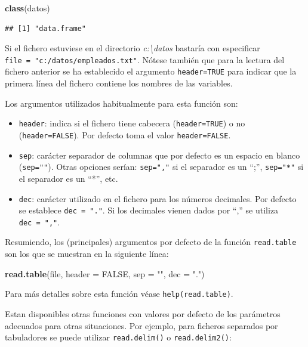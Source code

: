 \documentclass[
]{book}
\newenvironment{Shaded}{\begin{snugshade}}{\end{snugshade}}
\newcommand{\AttributeTok}[1]{\textcolor[rgb]{0.13,0.29,0.53}{#1}}
\newcommand{\ConstantTok}[1]{\textcolor[rgb]{0.56,0.35,0.01}{#1}}
\newcommand{\FunctionTok}[1]{\textcolor[rgb]{0.13,0.29,0.53}{\textbf{#1}}}
\newcommand{\NormalTok}[1]{#1}
\newcommand{\StringTok}[1]{\textcolor[rgb]{0.31,0.60,0.02}{#1}}
\begin{document}
\begin{Shaded}
\begin{Highlighting}[]
\FunctionTok{class}\NormalTok{(datos)}
\end{Highlighting}
\end{Shaded}

\begin{verbatim}
## [1] "data.frame"
\end{verbatim}

Si el fichero estuviese en el directorio \emph{c:\textbackslash datos} bastaría con especificar
\texttt{file\ =\ "c:/datos/empleados.txt"}.
Nótese también que para la lectura del fichero anterior se ha
establecido el argumento \texttt{header=TRUE} para indicar que la primera línea del
fichero contiene los nombres de las variables.

Los argumentos utilizados habitualmente para esta función son:

\begin{itemize}
\item
  \texttt{header}: indica si el fichero tiene cabecera (\texttt{header=TRUE}) o no
  (\texttt{header=FALSE}). Por defecto toma el valor \texttt{header=FALSE}.
\item
  \texttt{sep}: carácter separador de columnas que por defecto es un espacio
  en blanco (\texttt{sep=""}). Otras opciones serían: \texttt{sep=","} si el separador es
  un ``;'', \texttt{sep="*"} si el separador es un ``*'', etc.
\item
  \texttt{dec}: carácter utilizado en el fichero para los números decimales.
  Por defecto se establece \texttt{dec\ =\ "."}. Si los decimales vienen dados
  por ``,'' se utiliza \texttt{dec\ =\ ","}.
\end{itemize}

Resumiendo, los (principales) argumentos por defecto de la función
\texttt{read.table} son los que se muestran en la siguiente línea:

\begin{Shaded}
\begin{Highlighting}[]
\FunctionTok{read.table}\NormalTok{(file, }\AttributeTok{header =} \ConstantTok{FALSE}\NormalTok{, }\AttributeTok{sep =} \StringTok{""}\NormalTok{, }\AttributeTok{dec =} \StringTok{"."}\NormalTok{)  }
\end{Highlighting}
\end{Shaded}

Para más detalles sobre esta función véase
\texttt{help(read.table)}.

Estan disponibles otras funciones con valores por defecto de los parámetros
adecuados para otras situaciones. Por ejemplo, para ficheros separados por tabuladores
se puede utilizar \texttt{read.delim()} o \texttt{read.delim2()}:
\end{document}
